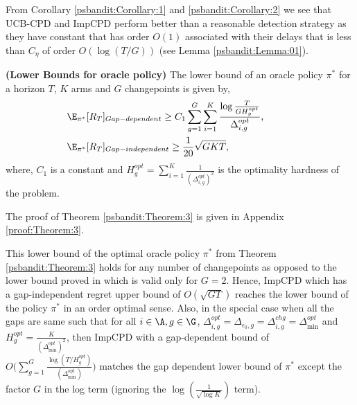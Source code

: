 \begin{discussion}
\label{dis:delay:corollary}
From Corollary \ref{psbandit:Corollary:1} and \ref{psbandit:Corollary:2} we see that  UCB-CPD and ImpCPD perform better than a reasonable detection strategy as they have constant that has order $O(1)$ associated with their delays that is less than $C_\eta$ of order $O(\log(T/G))$ (see Lemma \ref{psbandit:Lemma:01}).
\end{discussion}


\begin{customtheorem}{3}\textbf{(Lower Bounds for oracle policy)}
\label{psbandit:Theorem:3}
The lower bound of an oracle policy $\pi^*$ for a horizon $T$, $K$ arms and $G$ changepoints is given by,
\begin{align*}
&\E_{\pi^*}[R_T]_{Gap-dependent} \geq C_1\sum\limits_{g=1}^G\sum\limits_{i=1}^K\dfrac{ \log{\frac{T}{GH^{opt}_g}}}{\Delta_{i,g}^{opt}} \text{,\hspace*{3em}} \\
 &\E_{\pi^*}[R_T]_{Gap-independent} \geq \dfrac{1}{20}\sqrt{GKT},
\end{align*}
where, $C_1$ is a constant and $H^{opt}_g = \sum\limits_{i=1}^{K}\frac{1}{(\Delta^{opt}_{i,g})^2}$ is the optimality hardness of the problem.
\end{customtheorem}

\begin{customproof}{7}
The proof of Theorem \ref{psbandit:Theorem:3} is given in Appendix \ref{proof:Theorem:3}.
\end{customproof}

\begin{discussion}
\label{dis:Theorem:3}
This lower bound of the optimal oracle policy $\pi^*$ from Theorem \ref{psbandit:Theorem:3} holds for any number of changepoints as opposed to the lower bound proved in \citet{garivier2011upper} which is valid only for $G=2$. Hence, ImpCPD which has a gap-independent regret upper bound of $O(\sqrt{GT})$ reaches the lower bound of the  policy $\pi^*$ in an order optimal sense.  Also, in the special case when all the gaps are same such that for all $i\in\A,g\in\G$, $\Delta^{opt}_{i,g} = \Delta^{}_{\epsilon_0, g} = \Delta^{chg}_{i,g} = \Delta^{opt}_{\min}$ and $H^{opt}_g = \frac{K}{(\Delta^{opt}_{\min})^2}$, then ImpCPD with a gap-dependent bound of $O\big(\sum\limits_{g=1}^G\frac{\log({T}/{H^{opt}_{g}})}{(\Delta^{opt}_{\min})}\big)$ matches the gap dependent lower bound of $\pi^*$ except the factor $G$ in the log term (ignoring the $\log(\frac{1}{\sqrt{\log K}})$ term).
\end{discussion}

